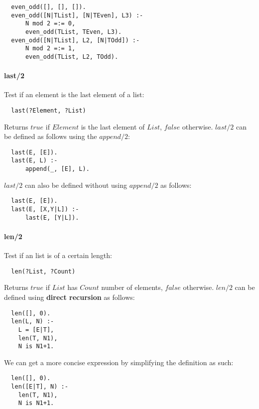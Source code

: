 \documentclass{article}
\begin{document}
\begin{multicols}{2}
  \begin{lstlisting}
  even_odd([], [], []).
  even_odd([N|TList], [N|TEven], L3) :- 
      N mod 2 =:= 0,
      even_odd(TList, TEven, L3).
  even_odd([N|TList], L2, [N|TOdd]) :- 
      N mod 2 =:= 1,
      even_odd(TList, L2, TOdd).
  \end{lstlisting} 
  
  \paragraph{last/2} Test if an element is the last element of a list:
  
  \begin{lstlisting}
  last(?Element, ?List)
  \end{lstlisting} 
  
  Returns $true$ if $Element$ is the last element of $List$, $false$ otherwise. $last/2$ can be defined as follows using the $append/2$:
  
  \begin{lstlisting}
  last(E, [E]).
  last(E, L) :-
      append(_, [E], L).
  \end{lstlisting} 
  
  $last/2$ can also be defined without using $append/2$ as follows:  
  
  \begin{lstlisting}
  last(E, [E]).
  last(E, [X,Y|L]) :-
      last(E, [Y|L]).
  \end{lstlisting} 
  
  \paragraph{len/2} Test if an list is of a certain length:
  
  \begin{lstlisting}
  len(?List, ?Count)
  \end{lstlisting} 
  
  Returns $true$ if $List$ has $Count$ number of elements, $false$ otherwise. $len/2$ can be defined using {\bf direct recursion} as follows:
  
  \begin{lstlisting}
  len([], 0).
  len(L, N) :-
	L = [E|T],
	len(T, N1),
	N is N1+1.
  \end{lstlisting} 
  
  We can get a more concise expression by simplifying the definition as such:  
  
  \begin{lstlisting}
  len([], 0).
  len([E|T], N) :-
	len(T, N1),
	N is N1+1.
  \end{lstlisting} 


\end{multicols}
\end{document}
